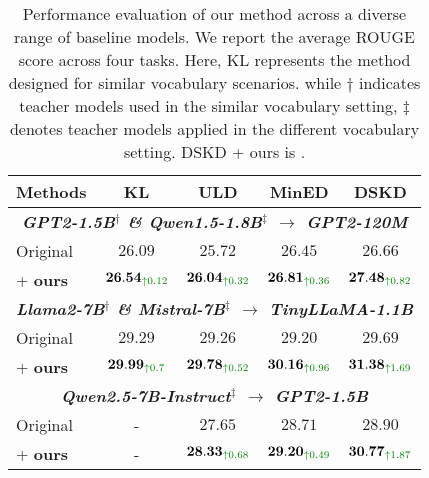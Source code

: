\begin{table}[ht]
\centering
\begin{adjustbox}{width=0.49\textwidth}
\begin{tabular}{l|c|c|c|c}
\toprule
\textbf{Methods} & \textbf{KL} & \textbf{ULD} & \textbf{MinED} & \textbf{DSKD} \\
\bottomrule
\toprule
\multicolumn{5}{c}{\textit{\textbf{GPT2-1.5B$^\dag$ \& Qwen1.5-1.8B$^\ddag$ $\rightarrow$ GPT2-120M}}} \\ 
\hline
Original & $26.09$ & $25.72$ & $26.45$ & $26.66$ \\
\quad + \textbf{ours} &
$\mathbf{26.54}_{\color{darkgreen}\uparrow 0.12}$ & $\mathbf{26.04}_{\color{darkgreen}\uparrow 0.32}$ & $\mathbf{26.81}_{\color{darkgreen}\uparrow 0.36}$ & $\mathbf{27.48}_{\color{darkgreen}\uparrow 0.82}$ \\
\toprule
\multicolumn{5}{c}{\textit{\textbf{Llama2-7B$^\dag$ \& Mistral-7B$^\ddag$ $\rightarrow$ TinyLLaMA-1.1B}}} \\ 
\hline
Original & $29.29$ & $29.26$ & $29.20$ &  $29.69$ \\
\quad + \textbf{ours} & $\mathbf{29.99}_{\color{darkgreen}\uparrow 0.7}$ & $\mathbf{29.78}_{\color{darkgreen}\uparrow 0.52}$ & $\mathbf{30.16}_{\color{darkgreen}\uparrow 0.96}$ & $\mathbf{31.38}_{\color{darkgreen}\uparrow 1.69}$\\
 
\toprule 
\multicolumn{5}{c}{\textit{\textbf{Qwen2.5-7B-Instruct$^\ddag$ $\rightarrow$ GPT2-1.5B}}} \\  
\hline
Original & - & $27.65$ & $28.71$ & $28.90$ \\
\quad + \textbf{ours} & - & $\mathbf{28.33}_{\color{darkgreen}\uparrow 0.68}$ & $\mathbf{29.20}_{\color{darkgreen}\uparrow 0.49}$ & $\mathbf{30.77}_{\color{darkgreen}\uparrow 1.87}$ \\
\hline
\end{tabular}
\end{adjustbox}
\caption{Performance evaluation of our method across a diverse range of baseline models. We report the average ROUGE score across four tasks. Here, KL represents the method designed for similar vocabulary scenarios. while $\dag$ indicates teacher models used in the similar vocabulary setting, $\ddag$ denotes teacher models applied in the different vocabulary setting. DSKD + ours is \method.}
\label{tab:universal_rs}
\end{table}



